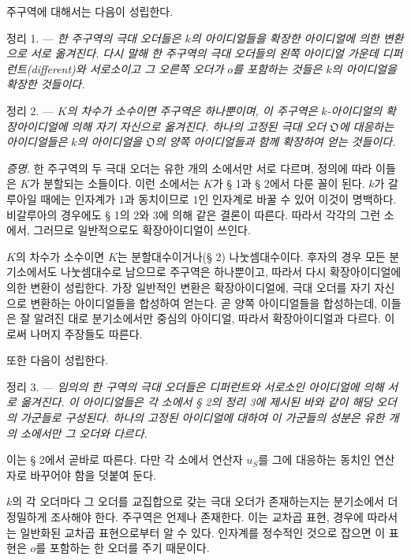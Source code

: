주구역에 대해서는 다음이 성립한다.

\medskip
\noindent\textsc{정리 1. ---} \emph{한 주구역의 극대 오더들은 $k$의 아이디얼들을 확장한 아이디얼에 의한 변환으로 서로 옮겨진다. 다시 말해 한 주구역의 극대 오더들의 왼쪽 아이디얼 가운데 디퍼런트(different)와 서로소이고 그 오른쪽 오더가 $o$를 포함하는 것들은 $k$의 아이디얼을 확장한 것들이다.}

\medskip
\noindent\textsc{정리 2. ---} \emph{$K$의 차수가 소수이면 주구역은 하나뿐이며, 이 주구역은 $k$-아이디얼의 확장아이디얼에 의해 자기 자신으로 옮겨진다. 하나의 고정된 극대 오더 $\mathfrak O$에 대응하는 아이디얼들은 $k$의 아이디얼을 $\mathfrak O$의 양쪽 아이디얼들과 함께 확장하여 얻는 것들이다.}

\emph{증명.} 한 주구역의 두 극대 오더는 유한 개의 소에서만 서로 다르며, 정의에 따라 이들은 $K$가 분할되는 소들이다. 이런 소에서는 $K$가 § 1과 § 2에서 다룬 꼴이 된다. $k$가 갈루아일 때에는 인자계가 $1$과 동치이므로 $1$인 인자계로 바꿀 수 있어 이것이 명백하다. 비갈루아의 경우에도 § 1의 2와 3에 의해 같은 결론이 따른다. 따라서 각각의 그런 소에서, 그러므로 일반적으로도 확장아이디얼이 쓰인다.

$K$의 차수가 소수이면 $K$는 분할대수이거나(§ 2) 나눗셈대수이다. 후자의 경우 모든 분기소에서도 나눗셈대수로 남으므로 주구역은 하나뿐이고, 따라서 다시 확장아이디얼에 의한 변환이 성립한다. 가장 일반적인 변환은 확장아이디얼에, 극대 오더를 자기 자신으로 변환하는 아이디얼들을 합성하여 얻는다. 곧 양쪽 아이디얼들을 합성하는데, 이들은 잘 알려진 대로 분기소에서만 중심의 아이디얼, 따라서 확장아이디얼과 다르다. 이로써 나머지 주장들도 따른다.

또한 다음이 성립한다.

\medskip
\noindent\textsc{정리 3. ---} \emph{임의의 한 구역의 극대 오더들은 디퍼런트와 서로소인 아이디얼에 의해 서로 옮겨진다. 이 아이디얼들은 각 소에서 § 2의 정리 3에 제시된 바와 같이 해당 오더의 가군들로 구성된다. 하나의 고정된 아이디얼에 대하여 이 가군들의 성분은 유한 개의 소에서만 그 오더와 다르다.}

이는 § 2에서 곧바로 따른다. 다만 각 소에서 연산자 $u_S$를 그에 대응하는 동치인 연산자로 바꾸어야 함을 덧붙여 둔다.

$k$의 각 오더마다 그 오더를 교집합으로 갖는 극대 오더가 존재하는지는 분기소에서 더 정밀하게 조사해야 한다. 주구역은 언제나 존재한다. 이는 교차곱 표현, 경우에 따라서는 일반화된 교차곱 표현으로부터 알 수 있다. 인자계를 정수적인 것으로 잡으면 이 표현은 $o$를 포함하는 한 오더를 주기 때문이다.

